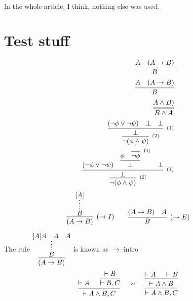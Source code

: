 \documentclass[11pt,a5paper,draft,oneside]{amsbook}
\begin{document}
		In the whole article, I think, nothing else was used.
\chapter{Test stuff}
	\begin{eqnarray}
		\infer{B}{A & (A \rightarrow B)}	\\
		\infer{B}{A & (A \rightarrow B)}	\\
		\infer={B \land A}{A \land B)}		\\
		\infer[^{(2)}]
     {\neg(\phi \land \psi)}
     {\infer[^{(1)}]
        {\bot}
        {(\neg\phi \lor \neg\psi) & \bot & \bot}
     }
     \\
     \infer[^{(2)}]
     {\neg(\phi \land \psi)}
     {\infer[^{(1)}]
        {\bot}
        {(\neg\phi \lor \neg\psi) & 
        \infer
            {\bot}
            {\phi & 
            \infer[^{(1)}]
            {\neg\phi}{}
            } 
        & \bot}
     }\\     
	\end{eqnarray}
$$
\infer[(\to I)]
     {(A \to B)}
     {
     \infer*{B}{[A]}
     }
\qquad
\infer[(\to E)]
     {B}
     {(A \to B) & A}
$$



The rule 
$\vcenter
{
\infer
    {(A \to B)}
    {
    \infer*{B}{[A] A & A & A}
    }
}$
is known as $\to$-intro
\newpage
\[
\begin{prooftree}
\Hypo{ \vdash A }
\Hypo{ \vdash B } \Infer1{ \vdash B, C }
\Infer2{ \vdash A\wedge B, C }
\end{prooftree}
%
\quad \rightsquigarrow \quad
\begin{prooftree}
\Hypo{ \vdash A } \Hypo{ \vdash B }
\Infer2{ \vdash A\wedge B }
\Infer1{ \vdash A\wedge B, C }
\end{prooftree}
\]
\end{document}
